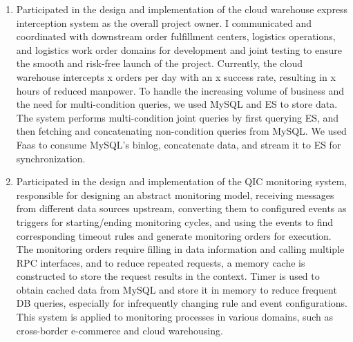 \documentclass{resume}
\newcommand{\en}[1]{#1}
\newcommand{\zh}[1]{}
\begin{document}
\begin{itemize}
\begin{enumerate}
	       \zh{参与云仓inbound链路设计和迭代，支持ERP和无ERP商家创建、打印补货单、预约入库、绿通预约入库（需审批）、产能占用、前置质检等。孵化云仓inbound服务，收拢行业逻辑（绿通预约入库、效期规则、清退校验、质检结果触发商家等），将云仓行业和库控平台架构代码解耦，明确职责，加速业务迭代。针对多个规则校验，如效期、清退等，采用策略和工厂模式实现，支持后续扩展性。
	       在入库前置质检项目中，需要上传多张货品实物、铭牌图片、说明书PDF等资源，沉淀通用手机扫码传图SDK，支持手机端扫码上传图反显到PC端，并且保证其隐私安全，限制扫码做到用后即焚，访问图片链接设置过期时间等，防止外界恶意用作图床。已支持供应链其他域使用，如货主入驻营业执照上传等场景。}\\
	       \item \en{Participated in the design and implementation of the cloud warehouse express interception system as the overall project owner. I communicated and coordinated with downstream order fulfillment centers, logistics operations, and logistics work order domains for development and joint testing to ensure the smooth and risk-free launch of the project. Currently, the cloud warehouse intercepts x orders per day with an x success rate, resulting in x hours of reduced manpower. To handle the increasing volume of business and the need for multi-condition queries, we used MySQL and ES to store data. The system performs multi-condition joint queries by first querying ES, and then fetching and concatenating non-condition queries from MySQL. We used Faas to consume MySQL's binlog, concatenate data, and stream it to ES for synchronization.}
	       \zh{参与云仓快递拦截设计和实现，作为整体项目owner，沟通协调下游订单履约中心、物流运配、物流工单各域的开发、联调，保障项目顺利无风险上线。目前云仓拦截单量达到x单/天，拦截成功率x，减少人力x小时。考虑查询多条件和业务量增长，使用MySQL和ES存储数据，多条件联合查询先查询ES，其他非条件查询从MySQL获取拼接返回。通过Faas消费MySQL的binlog，拼接数据后发MQ流式同步到ES。}\\
     		 \item \en{Participated in the design and implementation of the QIC monitoring system, responsible for designing an abstract monitoring model, receiving messages from different data sources upstream, converting them to configured events as triggers for starting/ending monitoring cycles, and using the events to find corresponding timeout rules and generate monitoring orders for execution. The monitoring orders require filling in data information and calling multiple RPC interfaces, and to reduce repeated requests, a memory cache is constructed to store the request results in the context. Timer is used to obtain cached data from MySQL and store it in memory to reduce frequent DB queries, especially for infrequently changing rule and event configurations. This system is applied to monitoring processes in various domains, such as cross-border e-commerce and cloud warehousing.}

\end{enumerate}
\end{itemize}
\end{document}
